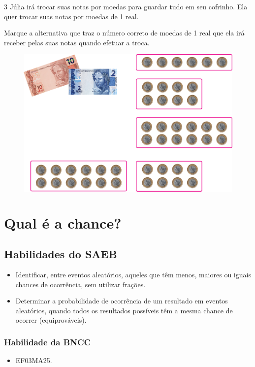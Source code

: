 \num{3} Júlia irá trocar suas notas por moedas para guardar tudo em seu
cofrinho. Ela quer trocar suas notas por moedas de 1 real.

Marque a
alternativa que traz o número correto de moedas de 1 real que ela
irá receber pelas suas notas quando efetuar a troca.

\begin{figure}[htpb!]
\centering
\includegraphics[width=.65\textwidth]{./media/image74.png}
\end{figure}

\chapter{Qual é a chance?}

\section*{Habilidades do SAEB}

\begin{itemize}
\item Identificar, entre eventos aleatórios, aqueles que têm menos, maiores ou
iguais chances de ocorrência, sem utilizar frações.

\item Determinar a probabilidade de ocorrência de um resultado em eventos
aleatórios, quando todos os resultados possíveis têm a mesma chance de
ocorrer (equiprováveis).
\end{itemize}

\subsection{Habilidade da BNCC}

\begin{itemize}
  \item 
 EF03MA25.
\end{itemize}

